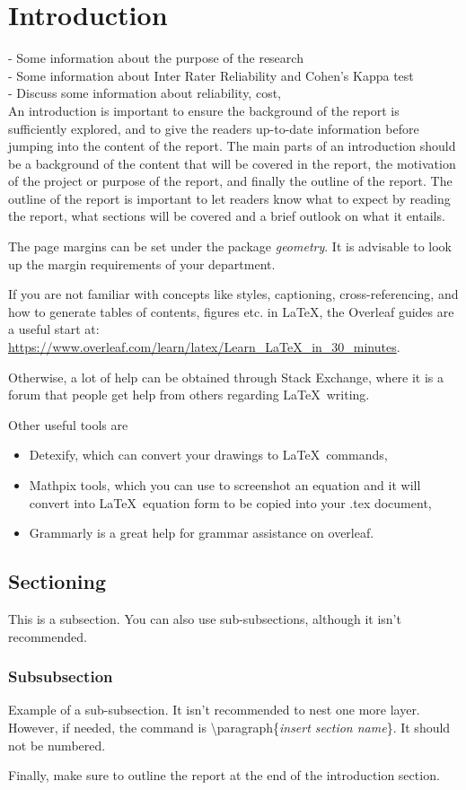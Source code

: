 \section{Introduction}
- Some information about the purpose of the research\\
- Some information about Inter Rater Reliability and Cohen's Kappa test\\
- Discuss some information about reliability, cost,\\[30pt]

An introduction is important to ensure the background of the report is sufficiently explored, and to give the readers up-to-date information before jumping into the content of the report. The main parts of an introduction should be a background of the content that will be covered in the report, the motivation of the project or purpose of the report, and finally the outline of the report. The outline of the report is important to let readers know what to expect by reading the report, what sections will be covered and a brief outlook on what it entails.

The page margins can be set under the package \textit{geometry}. It is advisable to look up the margin requirements of your department. 

If you are not familiar with concepts like styles, captioning, cross-referencing, and how to generate tables of contents, figures etc. in LaTeX, the Overleaf guides are a useful start at: \url{https://www.overleaf.com/learn/latex/Learn_LaTeX_in_30_minutes}. 

Otherwise, a lot of help can be obtained through Stack Exchange, where it is a forum that people get help from others regarding \LaTeX\ writing. 

Other useful tools are
\begin{itemize}
    \item Detexify, which can convert your drawings to \LaTeX\ commands, 
    \item Mathpix tools, which you can use to screenshot an equation and it will convert into \LaTeX\ equation form to be copied into your .tex document,
    \item Grammarly is a great help for grammar assistance on overleaf. 
\end{itemize}

\subsection{Sectioning}
This is a subsection. You can also use sub-subsections, although it isn't recommended.

\subsubsection{Subsubsection}
Example of a sub-subsection. It isn't recommended to nest one more layer. However, if needed, the command is \textbackslash paragraph\{\textit{insert section name}\}. It should not be numbered. 

\vspace{1em} 
Finally, make sure to outline the report at the end of the introduction section. 
